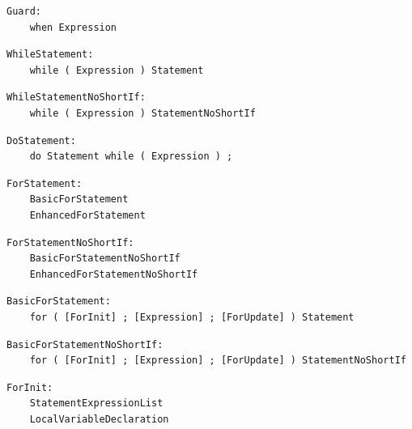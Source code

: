 \noindent\textbf{\texttt{}}\par
\begin{lstlisting}
Guard:
    when Expression
\end{lstlisting}

\noindent\textbf{\texttt{}}\par
\begin{lstlisting}
WhileStatement:
    while ( Expression ) Statement
\end{lstlisting}

\noindent\textbf{\texttt{}}\par
\begin{lstlisting}
WhileStatementNoShortIf:
    while ( Expression ) StatementNoShortIf
\end{lstlisting}

\noindent\textbf{\texttt{}}\par
\begin{lstlisting}
DoStatement:
    do Statement while ( Expression ) ;
\end{lstlisting}

\noindent\textbf{\texttt{}}\par
\begin{lstlisting}
ForStatement:
    BasicForStatement
    EnhancedForStatement
\end{lstlisting}

\noindent\textbf{\texttt{}}\par
\begin{lstlisting}
ForStatementNoShortIf:
    BasicForStatementNoShortIf
    EnhancedForStatementNoShortIf
\end{lstlisting}

\noindent\textbf{\texttt{}}\par
\begin{lstlisting}
BasicForStatement:
    for ( [ForInit] ; [Expression] ; [ForUpdate] ) Statement
\end{lstlisting}

\noindent\textbf{\texttt{}}\par
\begin{lstlisting}
BasicForStatementNoShortIf:
    for ( [ForInit] ; [Expression] ; [ForUpdate] ) StatementNoShortIf
\end{lstlisting}

\noindent\textbf{\texttt{}}\par
\begin{lstlisting}
ForInit:
    StatementExpressionList
    LocalVariableDeclaration
\end{lstlisting}

